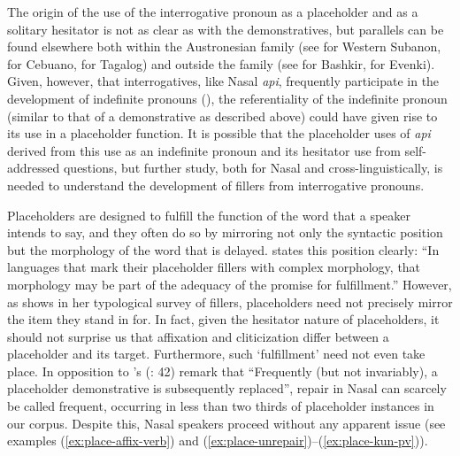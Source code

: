 \documentclass[output=paper,colorlinks,citecolor=brown
\ChapterDOI{10.5281/zenodo.15697585}
]{langscibook}
\begin{document}
The origin of the use of the interrogative pronoun as a placeholder and as a solitary hesitator is not as clear as with the demonstratives, but parallels can be found elsewhere both within the Austronesian family (see \cite[][]{blake2020westernsubanon} for Western Subanon, \cite[][]{tanangkingsing2022cebuano} for Cebuano, \cite{nagaya2022tagalog} for Tagalog) and outside the family (see \cite[][]{buskunbaeva2021bashkir} for Bashkir, \cite[][]{klyachko2022evenki} for Evenki). Given, however, that interrogatives, like Nasal \textit{api}, frequently participate in the development of indefinite pronouns (\cite{haspelmath_2001}), the referentiality of the indefinite pronoun (similar to that of a demonstrative as described above) could have given rise to its use in a placeholder function. It is possible that the placeholder uses of \textit{api} derived from this use as an indefinite pronoun and its hesitator use from self-addressed questions, but further study, both for Nasal and cross-linguistically, is needed to understand the development of fillers from interrogative pronouns.

Placeholders are designed to fulfill the function of the word that a speaker intends to say, and they often do so by mirroring not only the syntactic position but the morphology of the word that is delayed. \citet[6]{fox2010introduction} states this position clearly: ``In languages that mark their placeholder fillers with complex morphology, that morphology may be part of the adequacy of the promise for fulfillment.'' However, as \citet{podlesskaya2010parameters} shows in her typological survey of fillers, placeholders need not precisely mirror the item they stand in for. In fact, given the hesitator nature of placeholders, it should not surprise us that affixation and cliticization differ between a placeholder and its target. Furthermore, such `fulfillment' need not even take place. In opposition to \citeauthor{hayashi2010crosslinguistic}'s (\citeyear{hayashi2010crosslinguistic}: 42) remark that ``Frequently (but not invariably), a placeholder demonstrative is subsequently replaced'', repair in Nasal can scarcely be called frequent, occurring in less than two thirds of placeholder instances in our corpus. Despite this, Nasal speakers proceed without any apparent issue (see examples (\ref{ex:place-affix-verb}) and (\ref{ex:place-unrepair})–(\ref{ex:place-kun-pv})).
\end{document}
